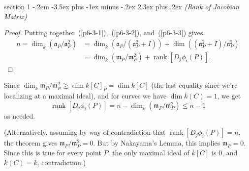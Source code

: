 \documentclass[12pt]{article}
\makeatletter
\theoremstyle{norm}
\newcommand{\ma}[0]{\mathfrak{a}}
\newcommand{\mm}[0]{\mathfrak{m}}
\newcommand{\bwoc}[0]{by way of contradiction}
\newcommand{\rank}{\operatorname{rank}}
\newcommand{\ol}[1]{\overline{#1}}
\newenvironment{problem}{\@startsection
       {section}
       {1}
       {-.2em}
       {-3.5ex plus -1ex minus -.2ex}
       {2.3ex plus .2ex}
       {\pagebreak[3]%
       \large\bf\noindent{Problem }
       }
       }
       {%
       }
\makeatother
\begin{document}
\begin{problem}{\it (Rank of Jacobian Matrix)}
\begin{proof}
Putting together~(\ref{p6-3-1}),~(\ref{p6-3-2}), and~(\ref{p6-3-3}) gives
\begin{align*}
n=\dim_{\ol k}(\ma_P/\ma_P^2)&= \dim_{\ol k}(\ma_P/(\ma_P^2+I))+\dim((\ma_P^2+I)/\ma_P^2)\\
&=\dim_{\ol k}(\mm_P/\mm_P^2)+\rank [D_j\phi_i(P)].
\end{align*}
\end{proof}
Since $\dim_{\ol{k}} \mm_P/\mm_P^2\geq \dim \ol{k}[C]_P=\dim\ol{k}[C]$ (the last equality since we're localizing at a maximal ideal), and for curves we have $\dim\ol{k}(C)=1$, we get
\[
\rank [D_j\phi_i(P)]=n-\dim_{\ol{k}}(\mm_P/\mm_P^2)\le n-1
\]
as needed.

(Alternatively, assuming \bwoc{} that $\rank [D_j\phi_i(P)]=n$, the theorem gives $\mm_P/\mm_P^2=0$. But by Nakayama's Lemma, this implies $\mm_P=0$. Since this is true for every point $P$, the only maximal ideal of $\ol{k}[C]$ is 0, and $\ol{k}(C)=\ol{k}$, contradiction.)
\end{problem}
\end{document}
